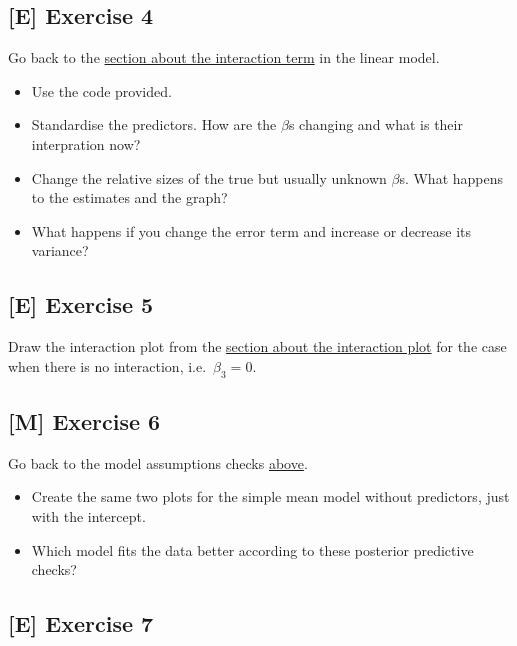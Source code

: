\documentclass[
]{book}
\providecommand{\tightlist}{%
  \setlength{\itemsep}{0pt}\setlength{\parskip}{0pt}}
\begin{document}
\subsection{{[}E{]} Exercise 4}\label{exercise4_multiple_regression}

Go back to the \hyperref[interaction_term]{section about the interaction term} in the linear model.

\begin{itemize}
\tightlist
\item
  Use the code provided.
\item
  Standardise the predictors. How are the \(\beta\)s changing and what is their interpration now?
\item
  Change the relative sizes of the true but usually unknown \(\beta\)s.
  What happens to the estimates and the graph?
\item
  What happens if you change the error term and increase or decrease its variance?
\end{itemize}

\subsection{{[}E{]} Exercise 5}\label{exercise5_multiple_regression}

Draw the interaction plot from the \hyperref[interaction_plot]{section about the interaction plot}
for the case when there is no interaction, i.e.~\(\beta_3 = 0\).

\subsection{{[}M{]} Exercise 6}\label{exercise6_multiple_regression}

Go back to the model assumptions checks \hyperref[check_model_bayes]{above}.

\begin{itemize}
\tightlist
\item
  Create the same two plots for the simple mean model without predictors, just with the intercept.
\item
  Which model fits the data better according to these posterior predictive checks?
\end{itemize}

\subsection{{[}E{]} Exercise 7}\label{exercise7_multiple_regression}
\end{document}
